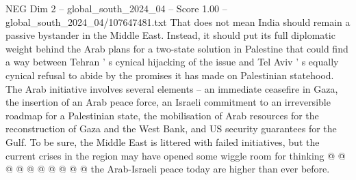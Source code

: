 \begin{textsample}{NEG Dim 2 – global\_south\_2024\_04 – Score 1.00 – global\_south\_2024\_04/107647481.txt}
That does not mean India should remain a passive bystander in the Middle East.
Instead, it should put its full diplomatic weight behind the Arab plans for a two-state solution in Palestine that could find a way between Tehran ' s cynical hijacking of the issue and Tel Aviv ' s equally cynical refusal to abide by the promises it has made on Palestinian statehood.
The Arab initiative involves several elements -- an immediate ceasefire in Gaza, the insertion of an Arab peace force, an Israeli commitment to an irreversible roadmap for a Palestinian state, the mobilisation of Arab resources for the reconstruction of Gaza and the West Bank, and US security guarantees for the Gulf.
To be sure, the Middle East is littered with failed initiatives, but the current crises in the region may have opened some wiggle room for thinking @ @ @ @ @ @ @ @ @ @ the Arab-Israeli peace today are higher than ever before.

\end{textsample}

